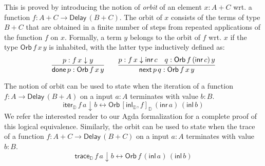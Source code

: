 \documentclass[runningheads,a4paper]{llncs}
\newcommand{\inl}{\mathsf{inl}}
\newcommand{\inr}{\mathsf{inr}}
\newcommand{\Delay}{\ensuremath{\mathsf{Delay}\,}}
\newcommand{\dn}{\downarrow}
\newcommand{\D}{\mathbb{D}}
\newcommand{\copairD}[2]{[#1,#2]_{\D}}
\newcommand{\inlD}{\mathsf{inl}_{\D}}
\newcommand{\iterD}{\mathsf{iter}_\D}
\newcommand{\traceD}{\mathsf{trace}_\D}
\newcommand{\Orb}[3]{\mathsf{Orb}\,#1\,#2\,#3}
\newcommand{\done}{\mathsf{done}}
\renewcommand{\next}{\mathsf{next}}
\begin{document}
This is proved by introducing the notion of \emph{orbit} of an element
$x : A + C$ wrt. a function $f : A + C \to \Delay (B + C)$. The orbit of
$x$ consists of the terms of type $B + C$ that are obtained in a
finite number of steps from repeated applications of the function $f$
on $x$. Formally, a term $y$ belongs to the orbit of $f$ wrt. $x$ if
the type $\Orb f x y $ is inhabited, with the latter type
inductively defined as: 
\[
\infer{\done\,p : \Orb f x y}{p : f \,x \dn y}
\qquad 
\infer{\next\,p \,q : \Orb f x y}{p : f \,x \dn \inr\,c & q : \Orb f
  {(\inr\,c)} y}
\]

The notion of orbit can be used to state when 
the iteration of a function $f : A \to \Delay (B + A)$ on a input
$a : A$ terminates with value $b : B$.
\[
\iterD\,f\,a \dn b \leftrightarrow \Orb {\copairD{\inlD}{f}} {(\inr\,a)} {(\inl\,b)}
\]
We refer the interested reader to our Agda formalization for a complete
proof of this logical equivalence.
Similarly, the orbit can be used to state when 
the trace of a function $f : A + C \to \Delay (B + C)$ on a input
$a : A$ terminates with value $b : B$.
\begin{equation}\label{eq:traceorbit}
\traceD\,f\,a \dn b \leftrightarrow \Orb f{(\inl\,a)} {(\inl\,b)}
\end{equation}
\end{document}
